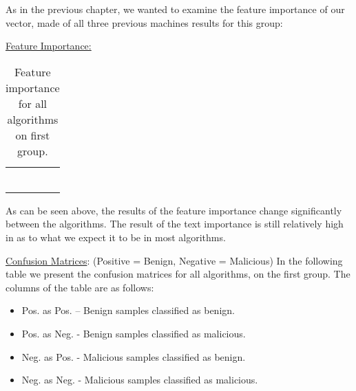 \documentclass{article}
\begin{document}
\clearpage
\newpage

\indent As in the previous chapter, we wanted to examine the feature importance of our vector, made of all three previous machines results for this group:

\noindent\underline{Feature Importance:}

\begin{table}[htb]
\centering
\begin{tabular}{|M{2.5cm}|M{2.5cm}|M{2.5cm}|M{2.5cm}|}
	\hline
	\centering{} &  &  & \tabularnewline
	\hline
	 &  &  & \tabularnewline
	\hline
	 &  &  & \tabularnewline
	\hline
	 &  &  & \tabularnewline
	\hline
	 &  &  & \tabularnewline
	\hline
	 &  &  & \tabularnewline
	\hline
	 &  &  & \tabularnewline
	\hline
\end{tabular}
\caption{Feature importance for all algorithms on first group.}
\end{table}

\indent As can be seen above, the results of the feature importance change significantly between the algorithms. The result of the text importance is still relatively high in as to what we expect it to be in most algorithms.

\indent \underline{Confusion Matrices}: (Positive = Benign, Negative = Malicious) 
\indent In the following table we present the confusion matrices for all algorithms, on the first group. The columns of the table are as follows:

\renewcommand{\labelitemi}{$\textendash$}
\begin{itemize}
    \item Pos. as Pos. – Benign samples classified as benign.
    \item Pos. as Neg. - Benign samples classified as malicious.
	\item Neg. as Pos. - Malicious samples classified as benign.
	\item Neg. as Neg. - Malicious samples classified as malicious.
\end{itemize}
\end{document}
